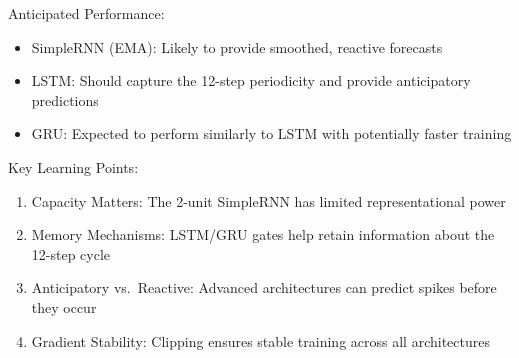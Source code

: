 \documentclass[
]{article}
\providecommand{\tightlist}{%
  \setlength{\itemsep}{0pt}\setlength{\parskip}{0pt}}
\begin{document}
Anticipated Performance:

\begin{itemize}
\tightlist
\item
  SimpleRNN (EMA): Likely to provide smoothed, reactive forecasts
\item
  LSTM: Should capture the 12-step periodicity and provide anticipatory
  predictions
\item
  GRU: Expected to perform similarly to LSTM with potentially faster
  training
\end{itemize}

Key Learning Points:

\begin{enumerate}
\def\labelenumi{\arabic{enumi}.}
\tightlist
\item
  Capacity Matters: The 2-unit SimpleRNN has limited representational
  power
\item
  Memory Mechanisms: LSTM/GRU gates help retain information about the
  12-step cycle
\item
  Anticipatory vs.~Reactive: Advanced architectures can predict spikes
  before they occur
\item
  Gradient Stability: Clipping ensures stable training across all
  architectures
\end{enumerate}
\end{document}
